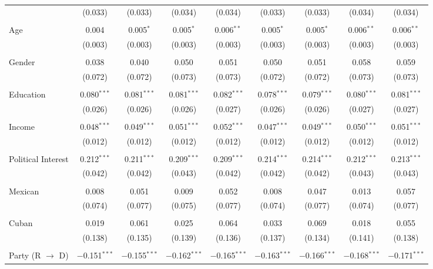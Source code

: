 \begin{table}[!htbp]
\begin{tabular}{@{\extracolsep{5pt}}lcccccccc}
  & (0.033) & (0.033) & (0.034) & (0.034) & (0.033) & (0.033) & (0.034) & (0.034) \\ 
  & & & & & & & & \\ 
 Age & 0.004 & 0.005$^{*}$ & 0.005$^{*}$ & 0.006$^{**}$ & 0.005$^{*}$ & 0.005$^{*}$ & 0.006$^{**}$ & 0.006$^{**}$ \\ 
  & (0.003) & (0.003) & (0.003) & (0.003) & (0.003) & (0.003) & (0.003) & (0.003) \\ 
  & & & & & & & & \\ 
 Gender & 0.038 & 0.040 & 0.050 & 0.051 & 0.050 & 0.051 & 0.058 & 0.059 \\ 
  & (0.072) & (0.072) & (0.073) & (0.073) & (0.072) & (0.072) & (0.073) & (0.073) \\ 
  & & & & & & & & \\ 
 Education & 0.080$^{***}$ & 0.081$^{***}$ & 0.081$^{***}$ & 0.082$^{***}$ & 0.078$^{***}$ & 0.079$^{***}$ & 0.080$^{***}$ & 0.081$^{***}$ \\ 
  & (0.026) & (0.026) & (0.026) & (0.027) & (0.026) & (0.026) & (0.027) & (0.027) \\ 
  & & & & & & & & \\ 
 Income & 0.048$^{***}$ & 0.049$^{***}$ & 0.051$^{***}$ & 0.052$^{***}$ & 0.047$^{***}$ & 0.049$^{***}$ & 0.050$^{***}$ & 0.051$^{***}$ \\ 
  & (0.012) & (0.012) & (0.012) & (0.012) & (0.012) & (0.012) & (0.012) & (0.012) \\ 
  & & & & & & & & \\ 
 Political Interest & 0.212$^{***}$ & 0.211$^{***}$ & 0.209$^{***}$ & 0.209$^{***}$ & 0.214$^{***}$ & 0.214$^{***}$ & 0.212$^{***}$ & 0.213$^{***}$ \\ 
  & (0.042) & (0.042) & (0.043) & (0.042) & (0.042) & (0.042) & (0.043) & (0.043) \\ 
  & & & & & & & & \\ 
 Mexican & 0.008 & 0.051 & 0.009 & 0.052 & 0.008 & 0.047 & 0.013 & 0.057 \\ 
  & (0.074) & (0.077) & (0.075) & (0.077) & (0.074) & (0.077) & (0.074) & (0.077) \\ 
  & & & & & & & & \\ 
 Cuban & 0.019 & 0.061 & 0.025 & 0.064 & 0.033 & 0.069 & 0.018 & 0.055 \\ 
  & (0.138) & (0.135) & (0.139) & (0.136) & (0.137) & (0.134) & (0.141) & (0.138) \\ 
  & & & & & & & & \\ 
 Party (R $\longrightarrow$ D) & $-$0.151$^{***}$ & $-$0.155$^{***}$ & $-$0.162$^{***}$ & $-$0.165$^{***}$ & $-$0.163$^{***}$ & $-$0.166$^{***}$ & $-$0.168$^{***}$ & $-$0.171$^{***}$ \\ 

\end{tabular}
\end{table}
